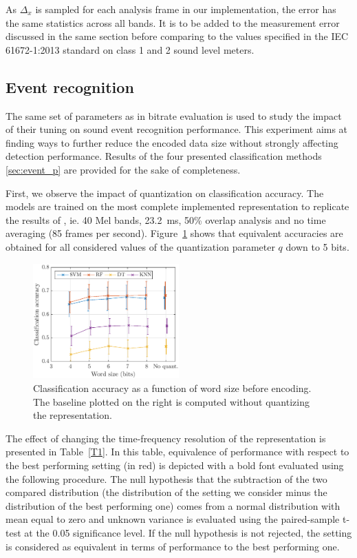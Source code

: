 \documentclass[sensors,article,submit,moreauthors,pdftex,10pt,a4paper]{mdpi}
\begin{document}
As $\Delta_x$ is sampled for each analysis frame in our implementation, the error has the same statistics across all bands. It is to be added to the measurement error discussed in the same section before comparing to the values specified in the IEC 61672-1:2013 \cite{iec-norm2} standard on class 1 and 2 sound level meters.

\subsection{Event recognition} \label{sec:event_r}

The same set of parameters as in bitrate evaluation is used to study the impact of their tuning on sound event recognition performance. This experiment aims at finding ways to further reduce the encoded data size without strongly affecting detection performance. Results of the four presented classification methods \ref{sec:event_p} are provided for the sake of completeness.

First, we observe the impact of quantization on classification accuracy. The models are trained on the most complete implemented representation to replicate the results of \citep{salamon2014}, ie. 40 Mel bands, 23.2~ms, 50\% overlap analysis and no time averaging (85 frames per second). Figure~\ref{fig:class_mel_q} shows that equivalent accuracies are obtained for all considered values of the quantization parameter $q$ down to 5 bits.\\

\begin{figure}[htbp]
	\centering
		\includegraphics[width=0.5\textwidth]{figures/class_mel_q.eps}
	\caption{Classification accuracy as a function of word size before encoding. The baseline plotted on the right is computed without quantizing the representation.}
	\label{fig:class_mel_q}
\end{figure}

The effect of changing the time-frequency resolution of the representation is presented in Table~\ref{T1}. In this table, equivalence of performance with respect to the best performing setting (in red) is depicted with a bold font evaluated using the following procedure. The null hypothesis that the subtraction of the two compared distribution (the distribution of the setting we consider minus the distribution of the best performing one) comes from a normal distribution with mean equal to zero and unknown variance is evaluated using the paired-sample t-test at the 0.05 significance level. If the null hypothesis is not rejected, the setting is considered as equivalent in terms of performance to the best performing one.
\end{document}
